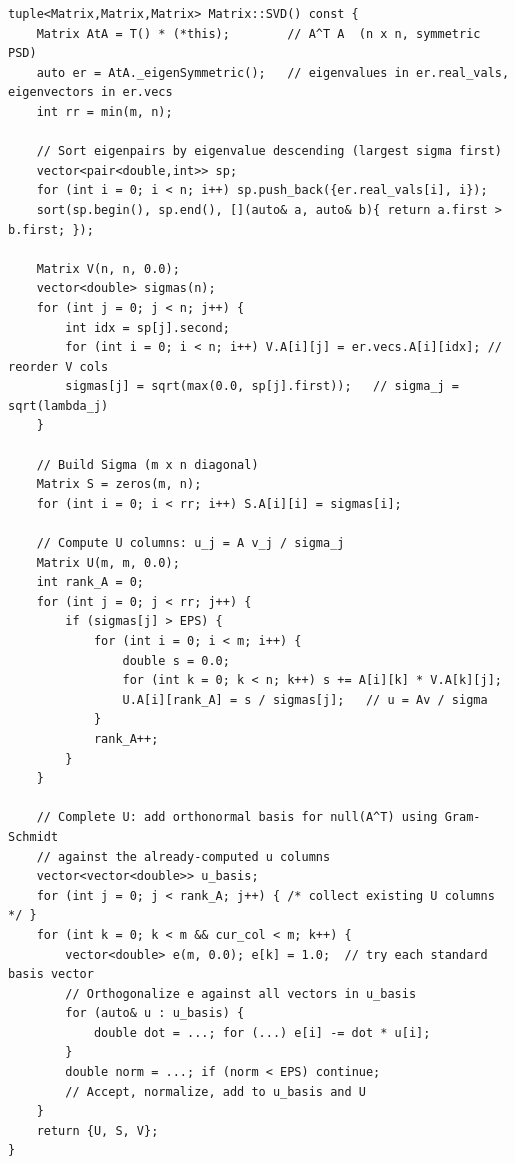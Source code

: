 \documentclass[12pt, a4paper]{article}
\begin{document}
\begin{lstlisting}
tuple<Matrix,Matrix,Matrix> Matrix::SVD() const {
    Matrix AtA = T() * (*this);        // A^T A  (n x n, symmetric PSD)
    auto er = AtA._eigenSymmetric();   // eigenvalues in er.real_vals, eigenvectors in er.vecs
    int rr = min(m, n);

    // Sort eigenpairs by eigenvalue descending (largest sigma first)
    vector<pair<double,int>> sp;
    for (int i = 0; i < n; i++) sp.push_back({er.real_vals[i], i});
    sort(sp.begin(), sp.end(), [](auto& a, auto& b){ return a.first > b.first; });

    Matrix V(n, n, 0.0);
    vector<double> sigmas(n);
    for (int j = 0; j < n; j++) {
        int idx = sp[j].second;
        for (int i = 0; i < n; i++) V.A[i][j] = er.vecs.A[i][idx]; // reorder V cols
        sigmas[j] = sqrt(max(0.0, sp[j].first));   // sigma_j = sqrt(lambda_j)
    }

    // Build Sigma (m x n diagonal)
    Matrix S = zeros(m, n);
    for (int i = 0; i < rr; i++) S.A[i][i] = sigmas[i];

    // Compute U columns: u_j = A v_j / sigma_j
    Matrix U(m, m, 0.0);
    int rank_A = 0;
    for (int j = 0; j < rr; j++) {
        if (sigmas[j] > EPS) {
            for (int i = 0; i < m; i++) {
                double s = 0.0;
                for (int k = 0; k < n; k++) s += A[i][k] * V.A[k][j];
                U.A[i][rank_A] = s / sigmas[j];   // u = Av / sigma
            }
            rank_A++;
        }
    }

    // Complete U: add orthonormal basis for null(A^T) using Gram-Schmidt
    // against the already-computed u columns
    vector<vector<double>> u_basis;
    for (int j = 0; j < rank_A; j++) { /* collect existing U columns */ }
    for (int k = 0; k < m && cur_col < m; k++) {
        vector<double> e(m, 0.0); e[k] = 1.0;  // try each standard basis vector
        // Orthogonalize e against all vectors in u_basis
        for (auto& u : u_basis) {
            double dot = ...; for (...) e[i] -= dot * u[i];
        }
        double norm = ...; if (norm < EPS) continue;
        // Accept, normalize, add to u_basis and U
    }
    return {U, S, V};
}
\end{lstlisting}
\end{document}
